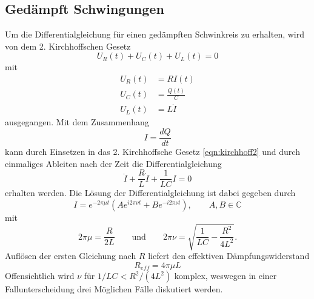 \subsection{Gedämpft Schwingungen}
\label{sec:gedämpft}
Um die Differentialgleichung für einen gedämpften Schwinkreis zu erhalten, wird von dem 2. Kirchhoffschen Gesetz
\begin{equation}
    U_R(t)+U_C(t)+U_L(t)=0
    \label{eqn:kirchhoff2}
\end{equation}
mit
\begin{align*}
U_R(t)&=RI(t)                           \\
U_C(t)&=\frac{Q(t)}{C}                  \\
U_L(t)&=L\dot{I}    
\end{align*}
ausgegangen. Mit dem Zusammenhang 
\begin{equation*}
    I=\frac{dQ}{dt}
\end{equation*}
kann durch Einsetzen in das 2. Kirchhoffsche Gesetz \eqref{eqn:kirchhoff2} und durch einmaliges Ableiten nach der Zeit
die Differentialgleichung
\begin{equation}
    \ddot{I}+\frac{R}{L}\dot{I}+\frac{1}{LC}I=0
    \label{eqn:DGL1}
\end{equation}
erhalten werden. Die Lösung der Differentialgleichung ist dabei gegeben durch
\begin{equation}
    I=e^{-2\pi\mu t}\left(Ae^{i2\pi\nu t}+Be^{-i2\pi\nu t}\right), \qquad A,B\in\mathbb{C}
    \label{eqn:Losung1}
\end{equation}
mit
\begin{equation*}
    2\pi \mu=\frac{R}{2L} 
    \qquad\text{und}\qquad 
    2\pi \nu=\sqrt{\frac{1}{LC}-\frac{R^2}{4L^2}} .
\end{equation*}
Auflösen der ersten Gleichung nach $R$ liefert den effektiven Dämpfungswiderstand 
\begin{equation}
    R_{eff}=4\pi\mu L 
    \label{eqn:Reff}
\end{equation}
Offensichtlich wird $\nu$ für $1/LC<R^2/(4L^2)$ komplex, weswegen in einer Fallunterscheidung drei Möglichen Fälle 
diskutiert werden.

